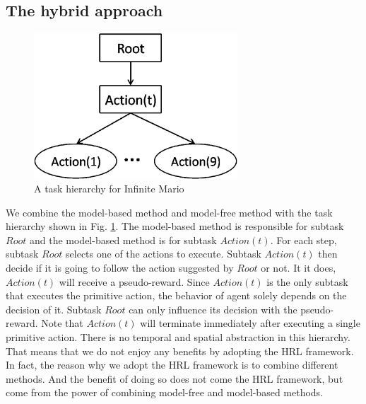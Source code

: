 \subsection{The hybrid approach}
\begin{figure}[ht]
    \begin{center}
    \includegraphics[width=3.0in] {./figures/MarioHierarchy.eps}
    \end{center}

\caption{A task hierarchy for Infinite Mario}
\label{fig:MarioHierarchy}
\end{figure}
We combine the model-based method and model-free method with the task hierarchy shown in Fig. \ref{fig:MarioHierarchy}.
The model-based method is responsible for subtask $Root$ and the model-based method is for
subtask $Action(t)$.
For each step, subtask $Root$ selects one of the actions to execute.
Subtask $Action(t)$ then decide if it is going to follow the action suggested by $Root$ or not. 
It it does, $Action(t)$ will receive a pseudo-reward. 
Since $Action(t)$ is the only subtask that executes the primitive action,
the behavior of agent solely depends on the decision of it.
Subtask $Root$ can only influence its decision with the pseudo-reward.
Note that $Action(t)$ will terminate immediately after executing a single primitive action.
There is no temporal and spatial abstraction in this hierarchy.
That means that we do not enjoy any benefits by adopting the HRL framework.
In fact, the reason why we adopt the HRL framework is to combine different methods.
And the benefit of doing so does not come the HRL framework, but come from the power of combining
model-free and model-based methods.

